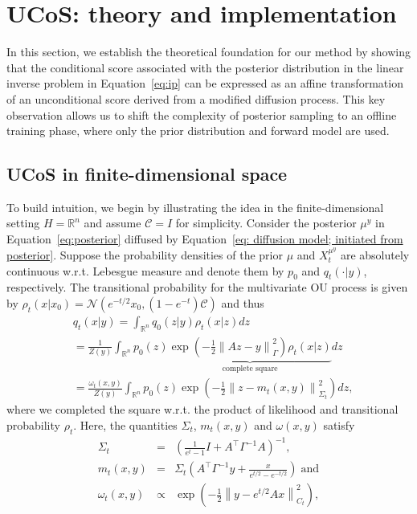 \documentclass[10pt]{article} %
\def\Eqref#1{Equation~\ref{#1}}
\newcommand{\R}{\mathbb{R}}
\theoremstyle{plain}
\theoremstyle{definition}
\theoremstyle{remark}
\newcommand{\norm}[1]{\left\|#1\right\|}
\newcommand{\C}{\mathcal C}
\newcommand{\fabian}[1]{{#1}}%
\begin{document}

\section{UCoS: theory and implementation}\label{sec:UCoS}
%

In this section, we establish the theoretical foundation for our method by showing that the conditional score associated with the posterior distribution in the linear inverse problem in \Eqref{eq:ip} can be expressed as an affine transformation of an unconditional score derived from a modified diffusion process. This key observation allows us to shift the complexity of posterior sampling to an offline training phase, where only the prior distribution and forward model are used. 
%
\subsection{UCoS in finite-dimensional space}\label{sec: finite dimensional UCoS}
To build intuition, we begin by illustrating the idea in the finite-dimensional setting $H=\R^n$ \fabian{and assume $\C = I$ for simplicity.}
Consider the posterior $\mu^y$ in \Eqref{eq:posterior} diffused by \Eqref{eq: diffusion model; initiated from posterior}. Suppose the probability densities of the prior $\mu$ and $X_t^{\mu^y}$ are absolutely continuous w.r.t. Lebesgue measure and denote them by $p_0$ and $q_t(\cdot | y)$, respectively. The transitional probability for the multivariate OU process is given by $\rho_t(x | x_0) = {\mathcal N}(e^{-t/2}x_0, (1-e^{-t})\C)$ and thus
\begin{equation}
    \begin{aligned}
    \label{eq:qt_identity}
    &q_t(x|y) =  \int_{\R^n} q_0(z|y) \rho_t(x | z) dz \\
    & = \frac{1}{Z(y)}\int_{\R^n}  p_0(z) \underbrace{\exp\left(-\frac 12 \norm{Az-y}^2_\Gamma\right) \rho_t(x | z)}_{\text{complete square}}dz \\
    & = \frac{\omega_t(x,y)}{Z(y)}\int_{\R^n}  p_0(z) \exp\left(-\frac 12 \norm{z-m_t(x,y)}_{\Sigma_t}^2\right) dz,
    \end{aligned}
\end{equation}
where we completed the square w.r.t. the product of likelihood and transitional probability $\rho_t$. Here, the quantities $\Sigma_t$, $m_t(x,y)$ and $\omega(x,y)$ satisfy
\begin{eqnarray*}
    \Sigma_t &=& \left( \frac{1}{e^t-1}I + A^\top \Gamma^{-1}A\right)^{-1}, \\
    m_t(x,y) & = & \Sigma_t \left(A^\top \Gamma^{-1} y + \frac{x}{e^{t/2} - e^{-t/2}}  \right) \; \text{and} \\
    \omega_t(x,y) & \propto & \exp\left(-\fabian{\frac{1}{2}}\norm{y-e^{t\fabian{/2}} Ax}_{C_t}^2\right),
\end{eqnarray*}
\end{document}
